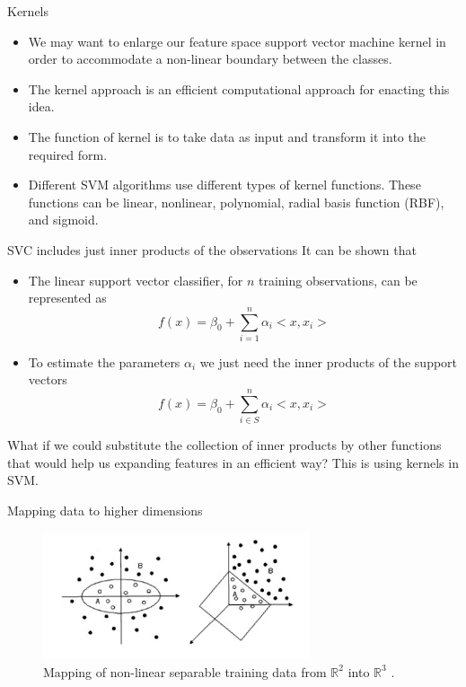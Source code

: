\documentclass{beamer}
\begin{document}
\begin{frame}{Kernels}
  \begin{itemize}
    \item We may want to enlarge our feature space support vector machine kernel in order to accommodate a non-linear boundary between the classes.
    \item The kernel approach is an efficient computational approach for enacting this idea.
    \item The function of kernel is to take data as input and transform it into the required form. 
    \item Different SVM algorithms use different types of kernel functions. These functions can be linear, nonlinear, polynomial, radial basis function (RBF), and sigmoid.
  \end{itemize}
\end{frame}

\begin{frame}{SVC includes just inner products of the observations}
  It can be shown that\cite{sohil_introduction_2022}
  \begin{itemize}
    \item The linear support vector classifier, for $n$ training observations, can be represented as
    \[
      f(x)=\beta_0 + \sum_{i=1}^n \alpha_i <x,x_i>
    \]
    \item To estimate the parameters $\alpha_i$ we just need the inner products of the support vectors 
    \[
      f(x)=\beta_0 + \sum_{i\in S}^n \alpha_i <x,x_i>
    \]
  \end{itemize}
  What if we could substitute the collection of inner products by other functions that would help us expanding features in an efficient way? This is using kernels in SVM.
\end{frame}

\begin{frame}{Mapping data to higher dimensions}
  \begin{figure}
    \includegraphics[width=0.7\textwidth]{mappingSVM}
    \caption{Mapping of non-linear separable training data from $\mathbb{R}^2$ into $\mathbb{R}^3$ \cite{hofmann_support_2006}.}
  \end{figure}
\end{frame}
\end{document}
